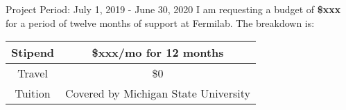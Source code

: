 \documentclass[12pt]{article}
\begin{document}
	Project Period: July 1, 2019 - June 30, 2020
\newline
I am requesting a budget of \textbf{\$xxx} for a period of twelve months of support at Fermilab. The breakdown is:

\begin{table}[!htb]
\begin{center}
  \begin{tabular}{| c | c |}
  \hline
  Stipend & \$xxx/mo for 12 months\\  
  \hline	
  Travel & \$0 \\
  \hline  
  Tuition & Covered by Michigan State University \\
  \hline
  \end{tabular}
\end{center}
\end{table}
\end{document}
